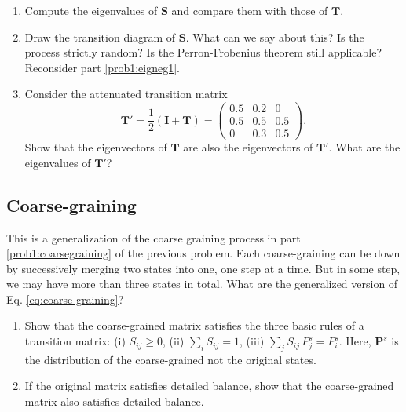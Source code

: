 \documentclass[12pt]{article}
\begin{document}
\begin{enumerate}
  \item
  Compute the eigenvalues of $\mathbf S$
  and compare them with those of $\mathbf T$.

  \item
  Draw the transition diagram of $\mathbf S$.
  What can we say about this?
  Is the process strictly random?
  Is the Perron-Frobenius theorem still applicable?
  Reconsider part \ref{prob1:eigneg1}.

  \item
  Consider the attenuated transition matrix
  $$
  \mathbf T'
  =
  \frac 1 2
  \left(
    \mathbf I
    +
    \mathbf T
  \right)
  =
  \left(
    \begin{array}{ccc}
      0.5   &   0.2   &   0     \\
      0.5   &   0.5   &   0.5   \\
      0     &   0.3   &   0.5
    \end{array}
  \right)
  .
  $$
  Show that the eigenvectors of $\mathbf T$
  are also the eigenvectors of $\mathbf T'$.
  What are the eigenvalues of $\mathbf T'$?


\end{enumerate}



\subsection{Coarse-graining}



This is a generalization of the coarse graining process
in part \ref{prob1:coarsegraining} of the previous problem.
%
Each coarse-graining
can be down by successively
merging two states into one,
one step at a time.
%
But in some step, we may have more than
three states in total.
%
What are the generalized version of Eq. \eqref{eq:coarse-graining}?
%
\begin{enumerate}
  \item
  Show that the coarse-grained matrix satisfies
  the three basic rules of a transition matrix:
  (i) $S_{ij} \ge 0$,
  (ii) $\sum_i S_{ij} = 1$,
  (iii) $\sum_j S_{ij} \, P^s_j = P^s_i$.
  Here, $\mathbf P^s$ is the distribution
  of the coarse-grained not the original states.

  \item
  If the original matrix satisfies detailed balance,
  show that the coarse-grained matrix also satisfies
  detailed balance.
\end{enumerate}
\end{document}
